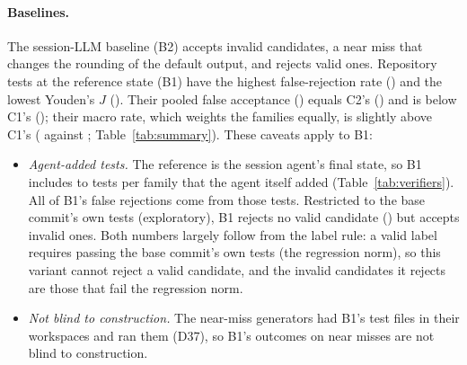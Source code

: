 \paragraph{Baselines.} The session-LLM baseline (B2) accepts  invalid candidates, a near miss that changes
the rounding of the default output, and rejects  valid ones. Repository tests at the reference state (B1)
have the highest false-rejection rate () and the lowest Youden's $J$ (). Their pooled false
acceptance () equals C2's () and is below C1's (); their macro rate, which weights the
families equally, is slightly above C1's ( against ; Table~\ref{tab:summary}). These
caveats apply to B1:
\begin{itemize}
\item \emph{Agent-added tests.} The reference is the session agent's final state, so B1 includes
   to  tests per family that the agent itself added
  (Table~\ref{tab:verifiers}). All  of B1's false rejections come from those tests. Restricted to the
  base commit's own tests (exploratory), B1 rejects no valid candidate () but accepts 
  invalid ones. Both numbers largely follow from the label rule: a valid label requires passing the base commit's own
  tests (the regression norm), so this variant cannot reject a valid candidate, and the invalid candidates it rejects are
  those that fail the regression norm.
\item \emph{Not blind to construction.} The near-miss generators had B1's test files in their workspaces and ran them
  (D37), so B1's outcomes on near misses are not blind to construction.
\end{itemize}

